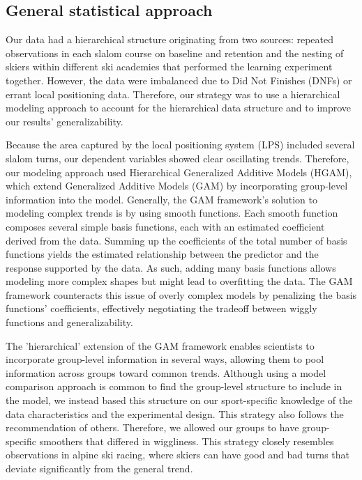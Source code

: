 \documentclass{article}
\begin{document}
\subsection*{General statistical approach}

Our data had a hierarchical structure originating from two sources: repeated observations in each slalom course on baseline and retention and the nesting of skiers within different ski academies that performed the learning experiment together. However, the data were imbalanced due to Did Not Finishes (DNFs) or errant local positioning data. Therefore, our strategy was to use a hierarchical modeling approach to account for the hierarchical data structure and to improve our results' generalizability.

Because the area captured by the local positioning system (LPS) included several slalom turns, our dependent variables showed clear oscillating trends. Therefore, our modeling approach used Hierarchical Generalized Additive Models (HGAM), which extend Generalized Additive Models (GAM) by incorporating group-level information into the model. Generally, the GAM framework's solution to modeling complex trends is by using smooth functions. Each smooth function composes several simple basis functions, each with an estimated coefficient derived from the data. Summing up the coefficients of the total number of basis functions yields the estimated relationship between the predictor and the response supported by the data. As such, adding many basis functions allows modeling more complex shapes but might lead to overfitting the data. The GAM framework counteracts this issue of overly complex models by penalizing the basis functions' coefficients, effectively negotiating the tradeoff between wiggly functions and generalizability. 

The 'hierarchical' extension of the GAM framework enables scientists to incorporate group-level information in several ways, allowing them to pool information across groups toward common trends. Although using a model comparison approach is common to find the group-level structure to include in the model, we instead based this structure on our sport-specific knowledge of the data characteristics and the experimental design. This strategy also follows the recommendation of others. Therefore, we allowed our groups to have group-specific smoothers that differed in wiggliness. This strategy closely resembles observations in alpine ski racing, where skiers can have good and bad turns that deviate significantly from the general trend.   
\end{document}

